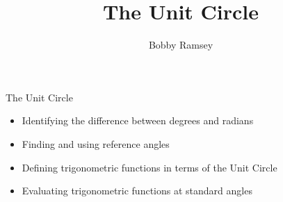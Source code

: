 \documentclass{ximera}
\author{Bobby Ramsey}
\title{The Unit Circle}
\begin{document}
\begin{abstract}
\end{abstract}
\maketitle


\begin{objectives}
	\item The Unit Circle
		\begin{itemize}
			\item Identifying the difference between degrees and radians
			\item Finding and using reference angles
			\item Defining trigonometric functions in terms of the Unit Circle 
			\item Evaluating trigonometric functions at standard angles
		\end{itemize}
\end{objectives}
\end{document}
